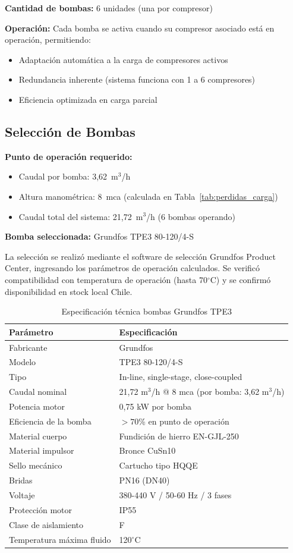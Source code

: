 \documentclass[12pt,a4paper]{article}
\begin{document}
\textbf{Cantidad de bombas:} 6 unidades (una por compresor)

\textbf{Operación:} Cada bomba se activa cuando su compresor asociado está en operación, permitiendo:
\begin{itemize}
    \item Adaptación automática a la carga de compresores activos
    \item Redundancia inherente (sistema funciona con 1 a 6 compresores)
    \item Eficiencia optimizada en carga parcial
\end{itemize}

\subsection{Selección de Bombas}
\label{sec:seleccion_bombas}

\textbf{Punto de operación requerido:}
\begin{itemize}
    \item Caudal por bomba: 3,62~m$^3$/h
    \item Altura manométrica: 8~mca (calculada en Tabla~\ref{tab:perdidas_carga})
    \item Caudal total del sistema: 21,72~m$^3$/h (6 bombas operando)
\end{itemize}

\textbf{Bomba seleccionada:} Grundfos TPE3 80-120/4-S

La selección se realizó mediante el software de selección Grundfos Product Center, ingresando los parámetros de operación calculados. Se verificó compatibilidad con temperatura de operación (hasta 70$^\circ$C) y se confirmó disponibilidad en stock local Chile.

\begin{table}[h]
\centering
\caption{Especificación técnica bombas Grundfos TPE3}
\small
\begin{tabular}{ll}
\toprule
\textbf{Parámetro} & \textbf{Especificación} \\
\midrule
Fabricante & Grundfos \\
Modelo & TPE3 80-120/4-S \\
Tipo & In-line, single-stage, close-coupled \\
Caudal nominal & 21,72 m$^3$/h @ 8 mca (por bomba: 3,62 m$^3$/h) \\
Potencia motor & 0,75 kW por bomba \\
Eficiencia de la bomba & $> 70$\% en punto de operación \\
Material cuerpo & Fundición de hierro EN-GJL-250 \\
Material impulsor & Bronce CuSn10 \\
Sello mecánico & Cartucho tipo HQQE \\
Bridas & PN16 (DN40) \\
Voltaje & 380-440 V / 50-60 Hz / 3 fases \\
Protección motor & IP55 \\
Clase de aislamiento & F \\
Temperatura máxima fluido & 120$^\circ$C \\
\bottomrule
\end{tabular}
\end{table}
\end{document}
